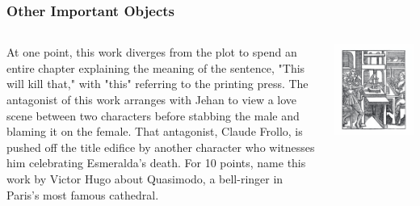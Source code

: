\documentclass[compress]{beamer}
\begin{document}
\begin{frame}
\frametitle{Other Important Objects}

\begin{columns}


  At one point, this work diverges from the plot to spend an entire
  chapter explaining the meaning of the sentence, "\alert<2>{This} will kill
  that," with "\alert<2>{this}" referring to \alert<2>{the printing press}. The antagonist
  of this work arranges with Jehan to view a love scene between two
  characters before stabbing the male and blaming it on the
  female. That antagonist, Claude Frollo, is pushed off the title
  edifice by another character who witnesses him celebrating
  Esmeralda's death. For 10 points, name this work by Victor Hugo
  about Quasimodo, a bell-ringer in Paris's most famous cathedral.

  \includegraphics[width=1.0\linewidth]{qb/instruction_figures/printing}


\end{columns}

\end{frame}
\end{document}
